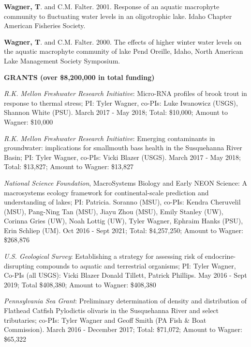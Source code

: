 \documentclass[10pt]{article}
\begin{document}
\begin{flushleft}
\begin{etaremune}
\item {\bf Wagner, T}. and C.M. Falter. 2001. Response of an aquatic macrophyte community to fluctuating water levels in an oligotrophic lake. Idaho Chapter American Fisheries Society.


\item {\bf Wagner, T}. and C.M. Falter. 2000. The effects of higher winter water levels on the aquatic macrophyte community of lake Pend Oreille, Idaho, North American Lake Management Society Symposium.


\end{etaremune}

\centerline {\bf{GRANTS (over \$8,200,000 in total funding)}}
\vspace{5pt}
\begin{etaremune}
\item {\sl  R.K. Mellon Freshwater Research Initiative}: Micro-RNA profiles of brook trout in response to thermal stress; PI: Tyler Wagner, co-PIs: Luke Iwanowicz (USGS), Shannon White (PSU). March 2017 - May 2018; Total: \$10,000; Amount to Wagner: \$10,000

\item {\sl  R.K. Mellon Freshwater Research Initiative}: Emerging contaminants in groundwater: implications for smallmouth bass health in the Susquehanna River Basin; PI: Tyler Wagner, co-PIs: Vicki Blazer (USGS). March 2017 - May 2018; Total: \$13,827; Amount to Wagner: \$13,827

\item {\sl National Science Foundation}, MacroSystems Biology and Early NEON Science: A macrosystems ecology framework for continental-scale prediction and understanding of lakes; PI: Patricia. Soranno (MSU), co-PIs: Kendra Cheruvelil (MSU), Pang-Ning Tan (MSU), Jiayu Zhou (MSU), Emily Stanley (UW), Corinna Gries (UW), Noah Lottig (UW), Tyler Wagner, Ephraim Hanks (PSU), Erin Schliep (UM). Oct 2016 - Sept 2021; Total: \$4,257,250; Amount to Wagner: \$268,876

\item {\sl U.S. Geological Survey}: Establishing a strategy for assessing risk of endocrine-disrupting compounds to aquatic and terrestrial organisms; PI: Tyler Wagner, Co-PIs (all USGS): Vicki Blazer Donald Tillett, Patrick Phillips. May 2016 - Sept 2019; Total \$408,380;  Amount to Wagner: \$408,380

\item {\sl Pennsylvania Sea Grant}: Preliminary determination of density and distribution of Flathead Catfish Pylodictis olivaris in the Susquehanna River and select tributaries; co-PIs: Tyler Wagner and Geoff Smith (PA Fish \& Boat Commission). March 2016 - December 2017; Total: \$71,072;  Amount to Wagner: \$65,322


\end{etaremune}
\end{flushleft}
\end{document}
